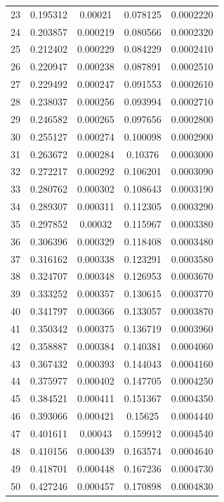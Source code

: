 \begin{table}[h]
{\begin{tabular}{ccccc}
23     & 0.195312 & 0.00021  & 0.078125 & 0.0002220 \\
24     & 0.203857 & 0.000219 & 0.080566 & 0.0002320 \\
25     & 0.212402 & 0.000229 & 0.084229 & 0.0002410 \\
26     & 0.220947 & 0.000238 & 0.087891 & 0.0002510 \\
27     & 0.229492 & 0.000247 & 0.091553 & 0.0002610 \\
28     & 0.238037 & 0.000256 & 0.093994 & 0.0002710 \\
29     & 0.246582 & 0.000265 & 0.097656 & 0.0002800 \\
30     & 0.255127 & 0.000274 & 0.100098 & 0.0002900 \\
31     & 0.263672 & 0.000284 & 0.10376  & 0.0003000 \\
32     & 0.272217 & 0.000292 & 0.106201 & 0.0003090 \\
33     & 0.280762 & 0.000302 & 0.108643 & 0.0003190 \\
34     & 0.289307 & 0.000311 & 0.112305 & 0.0003290 \\
35     & 0.297852 & 0.00032  & 0.115967 & 0.0003380 \\
36     & 0.306396 & 0.000329 & 0.118408 & 0.0003480 \\
37     & 0.316162 & 0.000338 & 0.123291 & 0.0003580 \\
38     & 0.324707 & 0.000348 & 0.126953 & 0.0003670 \\
39     & 0.333252 & 0.000357 & 0.130615 & 0.0003770 \\
40     & 0.341797 & 0.000366 & 0.133057 & 0.0003870 \\
41     & 0.350342 & 0.000375 & 0.136719 & 0.0003960 \\
42     & 0.358887 & 0.000384 & 0.140381 & 0.0004060 \\
43     & 0.367432 & 0.000393 & 0.144043 & 0.0004160 \\
44     & 0.375977 & 0.000402 & 0.147705 & 0.0004250 \\
45     & 0.384521 & 0.000411 & 0.151367 & 0.0004350 \\
46     & 0.393066 & 0.000421 & 0.15625  & 0.0004440 \\
47     & 0.401611 & 0.00043  & 0.159912 & 0.0004540 \\
48     & 0.410156 & 0.000439 & 0.163574 & 0.0004640 \\
49     & 0.418701 & 0.000448 & 0.167236 & 0.0004730 \\
50     & 0.427246 & 0.000457 & 0.170898 & 0.0004830 \\
\hline
  \end{tabular}
  }
 \end{table}